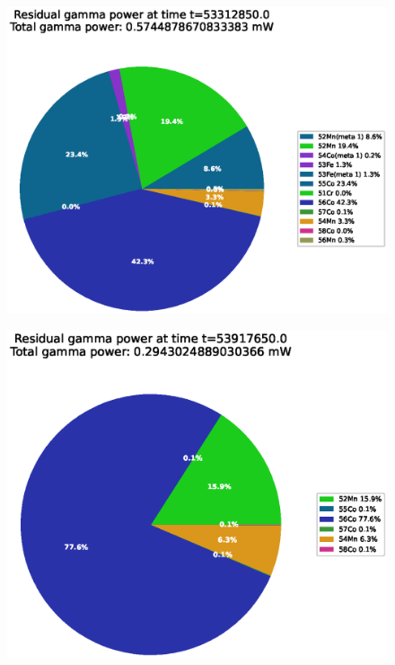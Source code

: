 \begin{figure}[!htb]
\centering
\includegraphics[width=0.7\linewidth]{chapters/results_activity_code/fe_100dpa/endofbeam/30MeV_0400_53312850.eps}
\caption{}
\label{fig:5mev-proton-100dpa}
\end{figure}

\begin{figure}[!htb]
\centering
\includegraphics[width=0.7\linewidth]{chapters/results_activity_code/fe_100dpa/endofbeam/30MeV_0500_53917650.eps}
\caption{}
\label{fig:5mev-proton-100dpa}
\end{figure}



